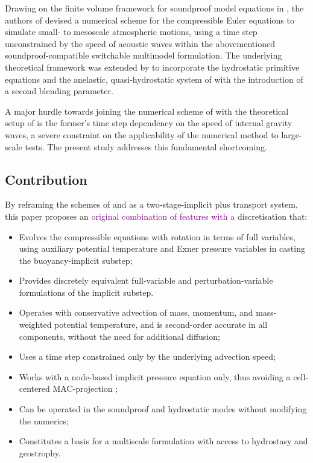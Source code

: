 \documentclass{ametsoc}
\newcommand{\purple}[1]{\textcolor{purple}{#1}}
\newcommand{\sblue}[1]{\textcolor{sblue}{#1}}
\newcommand{\tommaso}[1]{\purple{#1}}
\newcommand{\revision}[1]{\sblue{#1}}
\theoremstyle{definition}
\begin{document}
Drawing on the finite volume framework for soundproof model equations in \citet{KleinTCFD2009}, the authors of \citet{Benacchio2014, BenacchioEtAl2014} devised a numerical scheme for the compressible Euler equations to simulate small- to mesoscale atmospheric motions, using a time step unconstrained by the speed of acoustic waves within the abovementioned soundproof-compatible switchable multimodel formulation. The underlying theoretical framework was extended by \citet{KleinBenacchio2016} to incorporate the hydrostatic primitive equations and the anelastic, quasi-hydrostatic system of \cite{ArakawaKonor2009} with the introduction of a second blending parameter.

A major hurdle towards joining the numerical scheme of \cite{BenacchioEtAl2014} with the theoretical setup of \cite{KleinBenacchio2016} is the former's time step dependency on the speed of internal gravity waves, a severe constraint on the applicability of the numerical method to large-scale tests. The present study addresses this fundamental shortcoming. 

\subsection{Contribution}

By reframing the schemes of \cite{KleinTCFD2009} and \cite{BenacchioEtAl2014} as a two-stage-implicit plus transport system, this paper proposes an \tommaso{original combination of features with a} discretisation that:
%
\begin{itemize}
\item Evolves the compressible equations with rotation in terms of full variables, using auxiliary potential temperature and Exner pressure variables in casting the buoyancy-implicit substep;
\item \revision{Provides discretely equivalent full-variable and perturbation-variable formulations of the implicit substep.}
\item \revision{Operates with conservative advection of mass, momentum, and mass-weighted potential temperature, and is second-order accurate in all components, without the need for additional diffusion;}
\item Uses a time step constrained only by the underlying advection speed;
\item \revision{Works with a node-based implicit pressure equation only, thus avoiding a cell-centered MAC-projection \citep[see][and references therein]{AlmgrenEtAl1998,BenacchioEtAl2014}}; 
\item Can be operated in the soundproof and hydrostatic modes without modifying the numerics;
\item Constitutes a basis for a multiscale formulation with access to hydrostasy and geostrophy.
\end{itemize}
\end{document}

